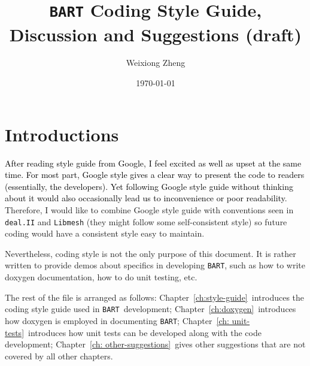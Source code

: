 \documentclass[openany]{book}
\title{{\tt BART} Coding Style Guide, Discussion and Suggestions (draft)} %
\author{Weixiong Zheng} %
\date{\today} %
\newcommand{\bart}{{\tt BART}}
\begin{document}
\maketitle %
\tableofcontents
\chapter{Introductions}
\textcolor{black}{After reading style guide from Google, I feel excited as well as upset at the same time. For most part, Google style gives a clear way to present the code to readers (essentially, the developers). Yet following Google style guide without thinking about it would also occasionally lead us to inconvenience or poor readability}. Therefore, I would like to combine Google style guide with conventions seen in {\tt deal.II} and {\tt Libmesh} (they might follow some self-consistent style) so future coding would have a consistent style easy to maintain.

Nevertheless, coding style is not the only purpose of this document. It is rather written to provide demos about specifics in developing \bart, such as how to write doxygen documentation, how to do unit testing, etc.

The rest of the file is arranged as follows: Chapter\ \ref{ch:style-guide}\ introduces the coding style guide used in \bart\ development; Chapter\ \ref{ch:doxygen}\ introduces how doxygen is employed in documenting \bart; Chapter\ \ref{ch: unit-tests}\ introduces how unit tests can be developed along with the code development; Chapter\ \ref{ch: other-suggestions}\ gives other suggestions that are not covered by all other chapters.
\end{document}

